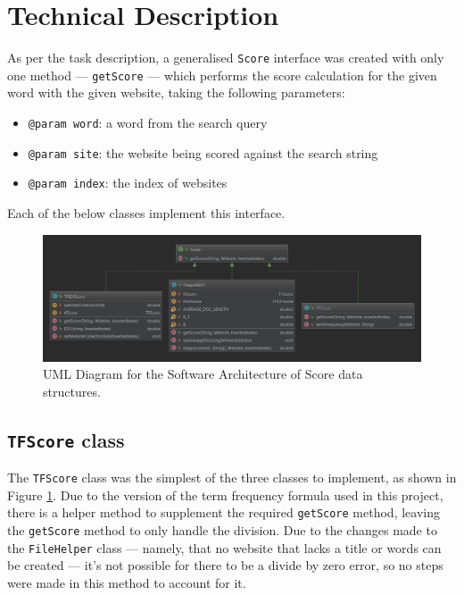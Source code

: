 \section{Technical Description}
As per the task description, a generalised {\tt Score} interface was created with only one method — {\tt getScore} — which performs the score calculation for the given word with the given website, taking the following parameters:
\begin{itemize}
    \item {\tt @param word}: a word from the search query
    \item {\tt @param site}: the website being scored against the search string
    \item {\tt @param index}: the index of websites
\end{itemize}
Each of the below classes implement this interface.

\begin{figure}[t]
    \centering
    \includegraphics[width=\textwidth]{figures/diagram-score}
    \caption{UML Diagram for the Software Architecture of Score data structures.}
    \label{fig:score:uml}
\end{figure}

\subsection{{\tt TFScore} class}
The {\tt TFScore} class was the simplest of the three classes to implement, as shown in Figure \ref{fig:score:uml}.
Due to the version of the term frequency formula used in this project, there is a helper method to supplement the required {\tt getScore} method, leaving the {\tt getScore} method to only handle the division.
Due to the changes made to the {\tt FileHelper} class — namely, that no website that lacks a title or words can be created — it's not possible for there to be a divide by zero error, so no steps were made in this method to account for it.

